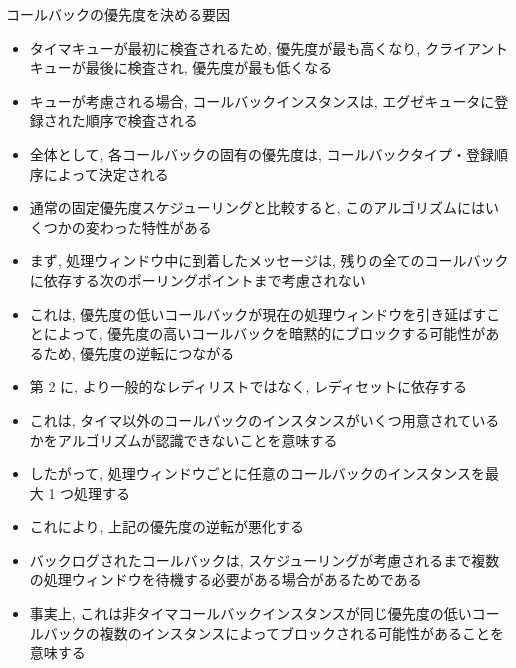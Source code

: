 \begin{frame}{コールバックの優先度を決める要因}
    \begin{itemize}
        \item タイマキューが最初に検査されるため, 優先度が最も高くなり, クライアントキューが最後に検査され, 優先度が最も低くなる
        \item キューが考慮される場合, コールバックインスタンスは, エグゼキュータに登録された順序で検査される
        \item 全体として, 各コールバックの固有の優先度は, コールバックタイプ・登録順序によって決定される
    \end{itemize}
\end{frame}

\begin{frame}{}
    \begin{itemize}
        \item 通常の固定優先度スケジューリングと比較すると, このアルゴリズムにはいくつかの変わった特性がある
        \item まず, 処理ウィンドウ中に到着したメッセージは, 残りの全てのコールバックに依存する次のポーリングポイントまで考慮されない
        \item これは, 優先度の低いコールバックが現在の処理ウィンドウを引き延ばすことによって, 優先度の高いコールバックを暗黙的にブロックする可能性があるため, 優先度の逆転につながる
    \end{itemize}
\end{frame}

\begin{frame}{}
    \begin{itemize}
        \item 第 2 に, より一般的なレディリストではなく, レディセットに依存する
        \item これは, タイマ以外のコールバックのインスタンスがいくつ用意されているかをアルゴリズムが認識できないことを意味する
        \item したがって, 処理ウィンドウごとに任意のコールバックのインスタンスを最大 1 つ処理する
        \item これにより, 上記の優先度の逆転が悪化する
        \item バックログされたコールバックは, スケジューリングが考慮されるまで複数の処理ウィンドウを待機する必要がある場合があるためである
        \item 事実上, これは非タイマコールバックインスタンスが同じ優先度の低いコールバックの複数のインスタンスによってブロックされる可能性があることを意味する
    \end{itemize}
\end{frame}
